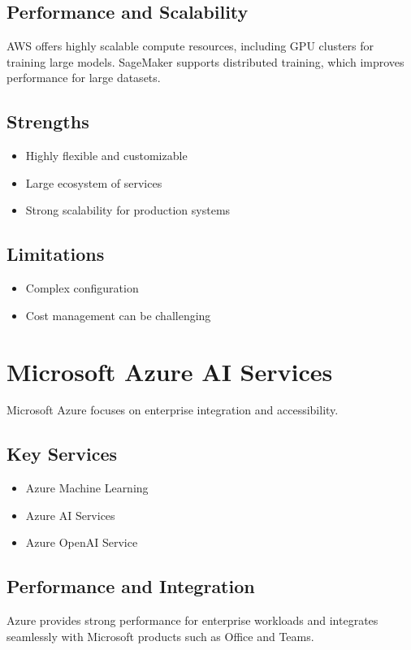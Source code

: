 \documentclass[conference]{IEEEtran}
\begin{document}
	\subsection{Performance and Scalability}
	AWS offers highly scalable compute resources, including GPU clusters for training large models. SageMaker supports distributed training, which improves performance for large datasets.
	
	\subsection{Strengths}
	\begin{itemize}
		\item Highly flexible and customizable
		\item Large ecosystem of services
		\item Strong scalability for production systems
	\end{itemize}
	
	\subsection{Limitations}
	\begin{itemize}
		\item Complex configuration
		\item Cost management can be challenging
	\end{itemize}
	
	\section{Microsoft Azure AI Services}
	Microsoft Azure focuses on enterprise integration and accessibility.
	
	\subsection{Key Services}
	\begin{itemize}
		\item Azure Machine Learning
		\item Azure AI Services
		\item Azure OpenAI Service
	\end{itemize}
	
	\subsection{Performance and Integration}
	Azure provides strong performance for enterprise workloads and integrates seamlessly with Microsoft products such as Office and Teams.
	
\end{document}
